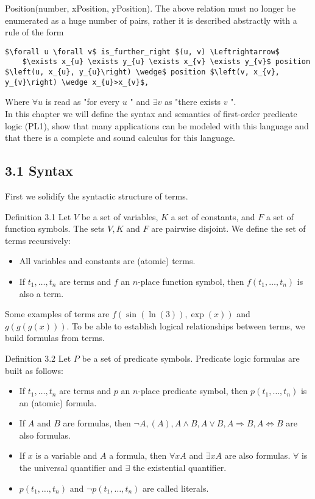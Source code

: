 \documentclass[10pt]{article}
\begin{document}
Position(number, xPosition, yPosition). The above relation must no longer be enumerated as a huge number of pairs, rather it is described abstractly with a rule of the form

\begin{verbatim}
$\forall u \forall v$ is_further_right $(u, v) \Leftrightarrow$
    $\exists x_{u} \exists y_{u} \exists x_{v} \exists y_{v}$ position $\left(u, x_{u}, y_{u}\right) \wedge$ position $\left(v, x_{v}, y_{v}\right) \wedge x_{u}>x_{v}$,
\end{verbatim}

Where $\forall u$ is read as "for every $u$ " and $\exists v$ as "there exists $v$ ".\\
In this chapter we will define the syntax and semantics of first-order predicate logic (PL1), show that many applications can be modeled with this language and that there is a complete and sound calculus for this language.

\subsection*{3.1 Syntax}
First we solidify the syntactic structure of terms.

Definition 3.1 Let $V$ be a set of variables, $K$ a set of constants, and $F$ a set of function symbols. The sets $V, K$ and $F$ are pairwise disjoint. We define the set of terms recursively:

\begin{itemize}
  \item All variables and constants are (atomic) terms.
  \item If $t_{1}, \ldots, t_{n}$ are terms and $f$ an $n$-place function symbol, then $f\left(t_{1}, \ldots, t_{n}\right)$ is also a term.
\end{itemize}

Some examples of terms are $f(\sin (\ln (3)), \exp (x))$ and $g(g(g(x)))$. To be able to establish logical relationships between terms, we build formulas from terms.

Definition 3.2 Let $P$ be a set of predicate symbols. Predicate logic formulas are built as follows:

\begin{itemize}
  \item If $t_{1}, \ldots, t_{n}$ are terms and $p$ an $n$-place predicate symbol, then $p\left(t_{1}, \ldots, t_{n}\right)$ is an (atomic) formula.
  \item If $A$ and $B$ are formulas, then $\neg A,(A), A \wedge B, A \vee B, A \Rightarrow B, A \Leftrightarrow B$ are also formulas.
  \item If $x$ is a variable and $A$ a formula, then $\forall x A$ and $\exists x A$ are also formulas. $\forall$ is the universal quantifier and $\exists$ the existential quantifier.
  \item $p\left(t_{1}, \ldots, t_{n}\right)$ and $\neg p\left(t_{1}, \ldots, t_{n}\right)$ are called literals.
\end{itemize}
\end{document}
